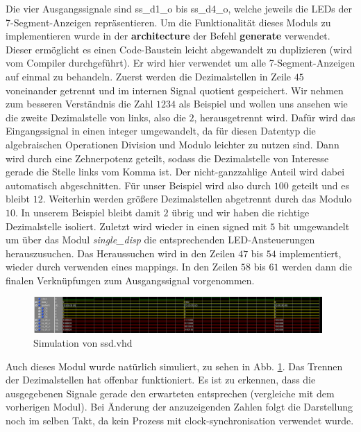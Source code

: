 

Die vier Ausgangssignale sind ss\_d1\_o bis ss\_d4\_o, welche jeweils die LEDs der 7-Segment-Anzeigen repräsentieren.
Um die Funktionalität dieses Moduls zu implementieren wurde in der \textbf{architecture} der Befehl \textbf{generate} verwendet.
Dieser ermöglicht es einen Code-Baustein leicht abgewandelt zu duplizieren (wird vom Compiler durchgeführt).
Er wird hier verwendet um alle 7-Segment-Anzeigen auf einmal zu behandeln.
Zuerst werden die Dezimalstellen in Zeile $45$ voneinander getrennt und im internen Signal quotient gespeichert.
Wir nehmen zum besseren Verständnis die Zahl $1234$ als Beispiel und wollen uns ansehen wie die zweite Dezimalstelle von links, also die $2$, herausgetrennt wird.
Dafür wird das Eingangssignal in einen integer umgewandelt, da für diesen Datentyp die algebraischen Operationen Division und Modulo leichter zu nutzen sind.
Dann wird durch eine Zehnerpotenz geteilt, sodass die Dezimalstelle von Interesse gerade die Stelle links vom Komma ist.
Der nicht-ganzzahlige Anteil wird dabei automatisch abgeschnitten.
Für unser Beispiel wird also durch $100$ geteilt und es bleibt $12$.
Weiterhin werden größere Dezimalstellen abgetrennt durch das Modulo $10$.
In unserem Beispiel bleibt damit $2$ übrig und wir haben die richtige Dezimalstelle isoliert.
Zuletzt wird wieder in einen signed mit $5$ bit umgewandelt um über das Modul \textit{single\_disp} die entsprechenden LED-Ansteuerungen herauszusuchen.
Das Heraussuchen wird in den Zeilen $47$ bis $54$ implementiert, wieder durch verwenden eines mappings.
In den Zeilen $58$ bis $61$ werden dann die finalen Verknüpfungen zum Ausgangssignal vorgenommen.

\begin{figure}[ht]
	\centering
    \includegraphics[width=0.98\textwidth]{../Daten/ssd.png}
	\caption{Simulation von ssd.vhd}
	\label{img_ssd}
\end{figure}

Auch dieses Modul wurde natürlich simuliert, zu sehen in Abb. \ref{img_ssd}.
Das Trennen der Dezimalstellen hat offenbar funktioniert.
Es ist zu erkennen, dass die ausgegebenen Signale gerade den erwarteten entsprechen (vergleiche mit dem vorherigen Modul).
Bei Änderung der anzuzeigenden Zahlen folgt die Darstellung noch im selben Takt, da kein Prozess mit clock-synchronisation verwendet wurde.

